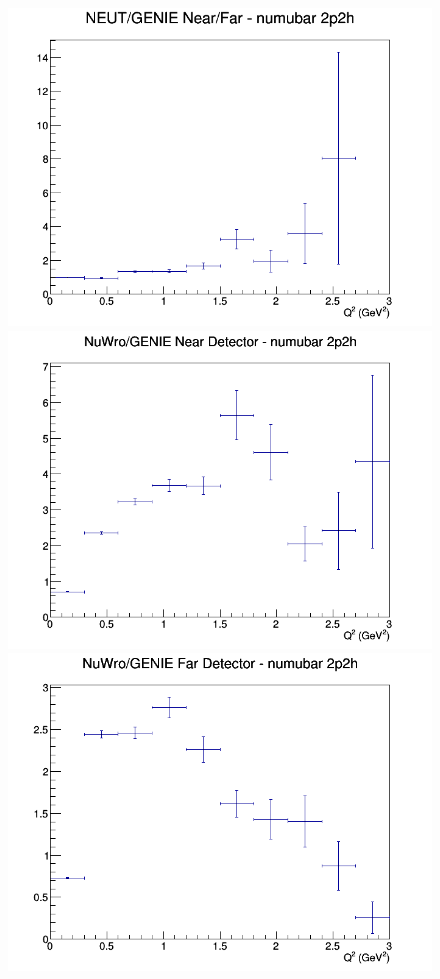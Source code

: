\documentclass[12pt]{article}
\begin{document}
\begin{figure}[h]
\endminipage
{}
\includegraphics[width=\linewidth]{eff_Q2/GAr/ratios/2p2h_NEUT_GENIE_numubar_NF_Q2.png}
\endminipage
\newline
{}
\includegraphics[width=\linewidth]{eff_Q2/GAr/ratios/2p2h_NuWro_GENIE_numubar_near_Q2.png}
\endminipage
{}
\includegraphics[width=\linewidth]{eff_Q2/GAr/ratios/2p2h_NuWro_GENIE_numubar_far_Q2.png}

\end{figure}
\end{document}
